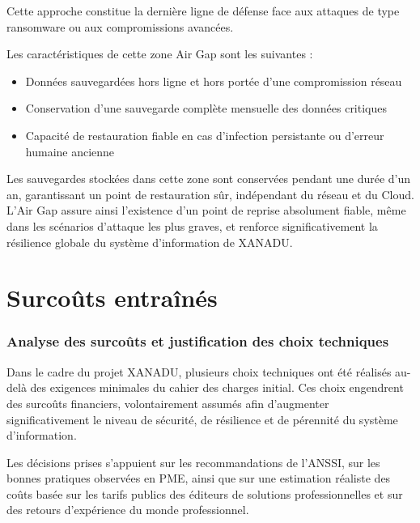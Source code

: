 \vspace{0.5cm}

\noindent Cette approche constitue la dernière ligne de défense face aux attaques de type ransomware ou aux compromissions avancées.

\noindent Les caractéristiques de cette zone Air Gap sont les suivantes :
\begin{itemize}
    \item Données sauvegardées hors ligne et hors portée d’une compromission réseau
    \item Conservation d’une sauvegarde complète mensuelle des données critiques
    \item Capacité de restauration fiable en cas d’infection persistante ou d’erreur humaine ancienne
\end{itemize}

\vspace{0.5cm}

\noindent Les sauvegardes stockées dans cette zone sont conservées pendant une durée d’un an, garantissant un point de restauration sûr, indépendant du réseau et du Cloud.
L’Air Gap assure ainsi l’existence d’un point de reprise absolument fiable, même dans les scénarios d’attaque les plus graves, et renforce significativement la résilience globale du système d’information de XANADU.

\newpage

\section*{Surcoûts entraînés}
{}

\subsubsection*{Analyse des surcoûts et justification des choix techniques}

Dans le cadre du projet XANADU, plusieurs choix techniques ont été réalisés au-delà des exigences minimales du cahier des charges initial. Ces choix engendrent des surcoûts financiers, volontairement assumés afin d’augmenter significativement le niveau de sécurité, de résilience et de pérennité du système d’information.

\noindent Les décisions prises s’appuient sur les recommandations de l’ANSSI, sur les bonnes pratiques observées en PME, ainsi que sur une estimation réaliste des coûts basée sur les tarifs publics des éditeurs de solutions professionnelles et sur des retours d’expérience du monde professionnel.

